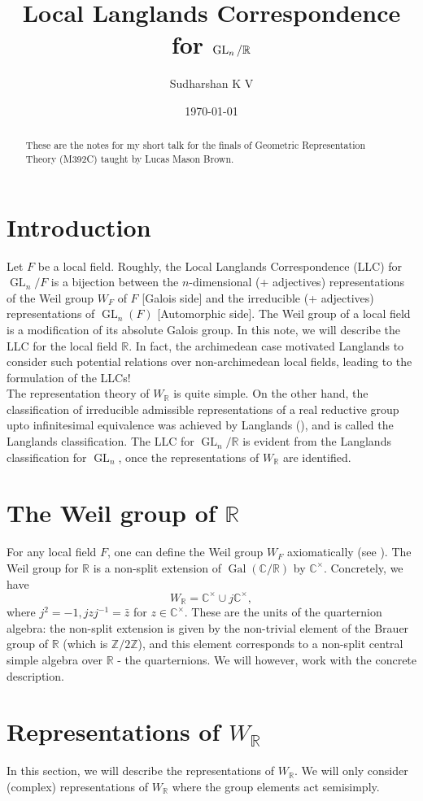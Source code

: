 \documentclass{amsart}
\title{Local Langlands Correspondence for $\GL_n/\R$}
\author{Sudharshan K V}
\date{\today}
\numberwithin{equation}{section}
\theoremstyle{plain}
\theoremstyle{definition}
\theoremstyle{remark}
\newcommand{\Z}{\mathbb{Z}}
\renewcommand{\_}[2]{\underbrace{#1}_{#2}}
\renewcommand{\^}[2]{\overbrace{#1}_{#2}}
\newcommand{\R}{\mathbb{R}}
\newcommand{\C}{\mathbb{C}}
\newcommand{\Gal}{\operatorname{Gal}}
\newcommand{\GL}{\operatorname{GL}}
\begin{document}
\maketitle
\begin{abstract}
  These are the notes for my short talk for the finals of Geometric Representation Theory (M392C) taught by Lucas Mason Brown.
\end{abstract}
\section{Introduction}
Let $F$ be a local field. Roughly, the Local Langlands Correspondence (LLC) for $\GL_n/F$ is a bijection between the $n$-dimensional (+ adjectives) representations of the Weil group $W_F$ of $F$ [Galois side] and the irreducible (+ adjectives) representations of $\GL_n(F)$ [Automorphic side]. The Weil group of a local field is a modification of its absolute Galois group. In this note, we will describe the LLC for the local field $\R$. In fact, the archimedean case motivated Langlands to consider such potential relations over non-archimedean local fields, leading to the formulation of the LLCs!\\

The representation theory of $W_\R$ is quite simple. On the other hand, the classification of irreducible admissible representations of a real reductive group upto infinitesimal equivalence was achieved by Langlands (\cite{langlands}), and is called the Langlands classification. The LLC for $\GL_n/\R$ is evident from the Langlands classification for $\GL_n$, once the representations of $W_\R$ are identified. 

\section{The Weil group of $\mathbb R$}
For any local field $F$, one can define the Weil group $W_F$ axiomatically (see \cite{tate}). The Weil group for $\R$ is a non-split extension of $\Gal(\C/\R)$ by $\C^\times$. Concretely, we have $$W_\R = \C^\times \cup j\C^\times,$$ where $j^2 = -1, jzj^{-1} = \bar z$ for $z \in \C^\times$. These are the units of the quarternion algebra: the non-split extension is given by the non-trivial element of the Brauer group of $\R$ (which is $\Z/2\Z$), and this element corresponds to a non-split central simple algebra over $\R$ - the quarternions. We will however, work with the concrete description.

\section{Representations of $W_\R$}
\label{sec:weil-rep}
In this section, we will describe the representations of $W_\R$. We will only consider (complex) representations of $W_\R$ where the group elements act semisimply.
\end{document}
